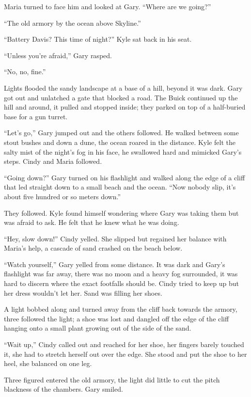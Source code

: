 Maria turned to face him and looked at Gary. ``Where are we going?''

``The old armory by the ocean above Skyline.''

``Battery Davis? This time of night?'' Kyle sat back in his seat.

``Unless you're afraid,'' Gary rasped.

``No, no, fine.''

Lights flooded the sandy landscape at a base of a hill, beyond it was
dark. Gary got out and unlatched a gate that blocked a road. The Buick
continued up the hill and around, it pulled and stopped inside; they
parked on top of a half-buried base for a gun turret.

``Let's go,'' Gary jumped out and the others followed. He walked between
some stout bushes and down a dune, the ocean roared in the distance.
Kyle felt the salty mist of the night's fog in his face, he swallowed
hard and mimicked Gary's steps. Cindy and Maria followed.

``Going down?'' Gary turned on his flashlight and walked along the edge
of a cliff that led straight down to a small beach and the ocean. ``Now
nobody slip, it's about five hundred or so meters down.''

They followed. Kyle found himself wondering where Gary was taking them
but was afraid to ask. He felt that he knew what he was doing.

``Hey, slow down!'' Cindy yelled. She slipped but regained her balance
with Maria's help, a cascade of sand crashed on the beach below.

``Watch yourself,'' Gary yelled from some distance. It was dark and
Gary's flashlight was far away, there was no moon and a heavy fog
surrounded, it was hard to discern where the exact footfalls should be.
Cindy tried to keep up but her dress wouldn't let her. Sand was filling
her shoes.

A light bobbed along and turned away from the cliff back towards the
armory, three followed the light; a shoe was lost and dangled off the
edge of the cliff hanging onto a small plant growing out of the side of
the sand.

``Wait up,'' Cindy called out and reached for her shoe, her fingers
barely touched it, she had to stretch herself out over the edge. She
stood and put the shoe to her heel, she balanced on one leg.

Three figured entered the old armory, the light did little to cut the
pitch blackness of the chambers. Gary smiled.

